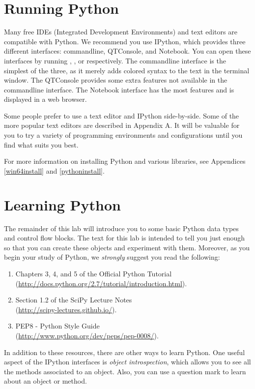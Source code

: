 \section*{Running Python}
Many free IDEs (Integrated Development Environments) and text editors are compatible with Python. We recommend you use IPython, which provides three different interfaces: commandline, QTConsole, and Notebook. You can open these interfaces by running , , or  respectively.
The commandline interface is the simplest of the three, as it merely adds colored syntax to the text in the terminal window.
The QTConsole provides some extra features not available in the commandline interface.
The Notebook interface has the most features and is displayed in a web browser.

Some people prefer to use a text editor and IPython side-by-side. Some of the more popular text editors are described in Appendix A. It will be valuable for you to try a variety of programming environments and configurations until you find what suits you best.

For more information on installing Python and various libraries, see Appendices \ref{win64install} and \ref{pythoninstall}.

\section*{Learning Python}
The remainder of this lab will introduce you to some basic Python data types and control flow blocks. The text for this lab is intended to tell you just enough so that you can create these objects and experiment with them. Moreover, as you begin your study of Python, we \emph{strongly} suggest you read the following:
\begin{enumerate}
\item Chapters 3, 4, and 5 of the Official Python Tutorial \\
        (\url{http://docs.python.org/2.7/tutorial/introduction.html}).
\item Section 1.2 of the SciPy Lecture Notes\\
        (\url{http://scipy-lectures.github.io/}).
\item PEP8 - Python Style Guide \\
        (\url{http://www.python.org/dev/peps/pep-0008/}).
\end{enumerate}

In addition to these resources, there are other ways to learn Python. One useful aspect of the IPython interfaces is \emph{object introspection}, which allows you to see all the methods associated to an object. Also, you can use a question mark to learn about an object or method.

